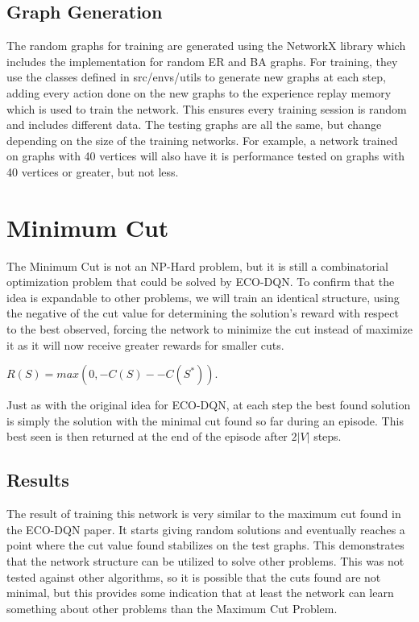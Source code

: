 \documentclass{article}
\begin{document}
\subsection{Graph Generation}

The random graphs for training are generated using the NetworkX library which includes the implementation for random ER and BA graphs. For training, they use the classes defined in src/envs/utils to generate new graphs at each step, adding every action done on the new graphs to the experience replay memory which is used to train the network. This ensures every training session is random and includes different data. The testing graphs are all the same, but change depending on the size of the training networks. For example, a network trained on graphs with 40 vertices will also have it is performance tested on graphs with 40 vertices or greater, but not less. 

\section{Minimum Cut}

The Minimum Cut is not an NP-Hard problem, but it is still a combinatorial optimization problem that could be solved by ECO-DQN. To confirm that the idea is expandable to other problems, we will train an identical structure, using the negative of the cut value for determining the solution's reward with respect to the best observed, forcing the network to minimize the cut instead of maximize it as it will now receive greater rewards for smaller cuts. 

$R(S) = max(0, -C(S) - -C(S^*))$. 

Just as with the original idea for ECO-DQN, at each step the best found solution is simply the solution with the minimal cut found so far during an episode. This best seen is then returned at the end of the episode after $2|V|$ steps.

\subsection{Results}

The result of training this network is very similar to the maximum cut found in the ECO-DQN paper. It starts giving random solutions and eventually reaches a point where the cut value found stabilizes on the test graphs. This demonstrates that the network structure can be utilized to solve other problems. This was not tested against other algorithms, so it is possible that the cuts found are not minimal, but this provides some indication that at least the network can learn something about other problems than the Maximum Cut Problem.
\end{document}
